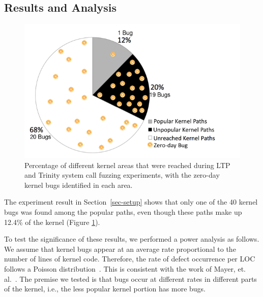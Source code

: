 \subsection{Results and Analysis}
\label{Verification-of-Hypothesis}

\begin{figure}
\centering
\includegraphics[width=1.0\columnwidth]{diagram/popular_paths.png}
\caption{\small Percentage of different kernel areas that were reached during
 LTP and Trinity system call fuzzing experiments, with the zero-day kernel bugs identified
 in each area.}
\label{fig:coverage}
\end{figure}

The experiment result in Section~\ref{sec-setup} shows that only one of the 40 kernel bugs
was found among the popular paths, even though these paths make up 12.4\% of the kernel
(Figure \ref{fig:coverage}).

To test the significance of these results, we
performed a power analysis as follows. 
%
We assume that kernel bugs appear at an average rate proportional to the
number of lines of kernel code.
Therefore, the rate of defect occurrence per LOC
follows a Poisson distribution~\cite{Poisson-distribution}.
This is consistent with the work of Mayer, et. al.~\cite{mayer1989probability}.
The premise we tested is that bugs occur at different rates in different
parts of the kernel, i.e., the less popular kernel portion has more bugs.

